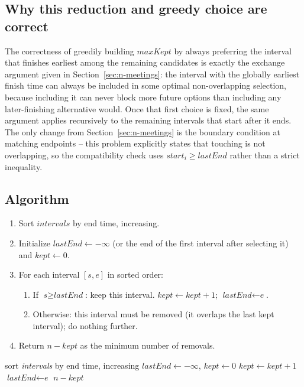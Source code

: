 \subsection*{Why this reduction and greedy choice are correct}

The correctness of greedily building $\textit{maxKept}$ by always preferring
the interval that finishes earliest among the remaining candidates is
exactly the exchange argument given in Section~\ref{sec:n-meetings}: the
interval with the globally earliest finish time can always be included in
some optimal non-overlapping selection, because including it can never
block more future options than including any later-finishing alternative
would. Once that first choice is fixed, the same argument applies
recursively to the remaining intervals that start after it ends. The only
change from Section~\ref{sec:n-meetings} is the boundary condition at
matching endpoints -- this problem explicitly states that touching is not
overlapping, so the compatibility check uses
$\textit{start}_i \ge \textit{lastEnd}$ rather than a strict inequality.

\subsection*{Algorithm}

\begin{enumerate}
  \item Sort $\textit{intervals}$ by end time, increasing.
  \item Initialize $\textit{lastEnd} \gets -\infty$ (or the end of the
        first interval after selecting it) and $\textit{kept} \gets 0$.
  \item For each interval $[\textit{s}, \textit{e}]$ in sorted order:
  \begin{enumerate}
    \item If $\textit{s} \ge \textit{lastEnd}$: keep this interval.
          $\textit{kept} \gets \textit{kept}+1$;
          $\textit{lastEnd} \gets \textit{e}$.
    \item Otherwise: this interval must be removed (it overlaps the last
          kept interval); do nothing further.
  \end{enumerate}
  \item Return $n - \textit{kept}$ as the minimum number of removals.
\end{enumerate}

\begin{algorithm}[H]
\caption{Minimum Removals for Non-overlapping Intervals}
\begin{algorithmic}[1]
  \State sort \textit{intervals} by end time, increasing
  \State $\textit{lastEnd} \gets -\infty$, $\textit{kept} \gets 0$
      \State $\textit{kept} \gets \textit{kept} + 1$
      \State $\textit{lastEnd} \gets \textit{e}$
    \EndIf
  \EndFor
  \State \Return $n - \textit{kept}$
\EndProcedure
\end{algorithmic}
\end{algorithm}

